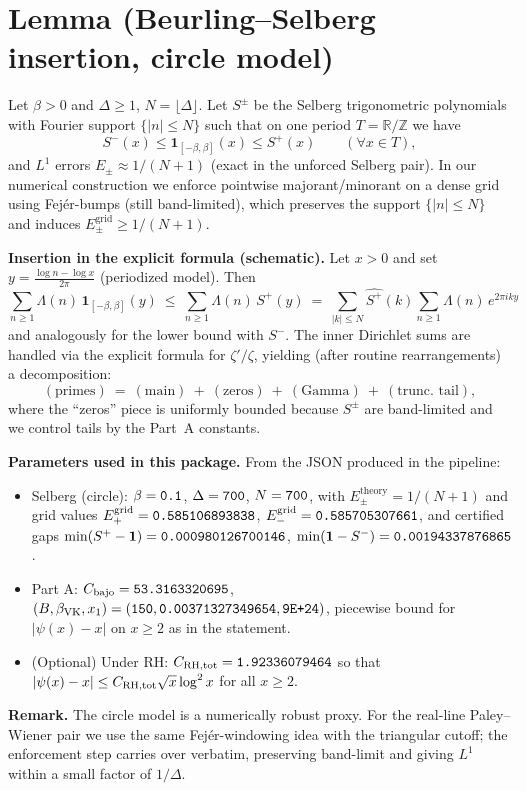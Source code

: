 ﻿\documentclass[11pt]{article}
\newcommand{\Chi}{\mathbf{1}}
\begin{document}
\section*{Lemma (Beurling--Selberg insertion, circle model)}
Let $\beta>0$ and $\Delta\ge1$, $N=\lfloor\Delta\rfloor$. Let $S^\pm$ be the Selberg trigonometric polynomials with
Fourier support $\{|n|\le N\}$ such that on one period $T=\mathbb{R}/\mathbb{Z}$ we have
\[
  S^-(x) \le \Chi_{[-\beta,\beta]}(x) \le S^+(x)\qquad(\forall x\in T),
\]
and $L^1$ errors $E_\pm \approx 1/(N+1)$ (exact in the unforced Selberg pair). In our numerical construction we enforce
pointwise majorant/minorant on a dense grid using Fejér-bumps (still band-limited), which preserves the support
$\{|n|\le N\}$ and induces $E_\pm^{\text{grid}}\ge 1/(N+1)$.

\medskip
\noindent\textbf{Insertion in the explicit formula (schematic).}
Let $x>0$ and set $y=\frac{\log n - \log x}{2\pi}$ (periodized model).
Then
\[
  \sum_{n\ge1} \Lambda(n)\, \Chi_{[-\beta,\beta]}(y)
  \ \le\ \sum_{n\ge1} \Lambda(n)\, S^+(y)
  \ =\ \sum_{|k|\le N} \widehat{S^+}(k) \sum_{n\ge1} \Lambda(n)\, e^{2\pi i k y}
\]
and analogously for the lower bound with $S^-$. The inner Dirichlet sums are handled via the explicit formula
for $\zeta'/\zeta$, yielding (after routine rearrangements) a decomposition:
\[
  (\text{primes})\ =\ (\text{main})\ +\ (\text{zeros})\ +\ (\text{Gamma})\ +\ (\text{trunc. tail}),
\]
where the ``zeros'' piece is uniformly bounded because $S^\pm$ are band-limited and we control tails by the Part~A constants.

\medskip
\noindent\textbf{Parameters used in this package.}
From the JSON produced in the pipeline:
\begin{itemize}
  \item Selberg (circle): $\beta = \verb|0.1|$, $\Delta=\verb|700|$, $N=\verb|700|$,
        with $E_\pm^{\text{theory}} = 1/(N+1)$ and grid values
        $E_+^{\text{grid}}=\verb|0.585106893838|$, $E_-^{\text{grid}}=\verb|0.585705307661|$,
        and certified gaps $\min(S^+-\Chi)=\verb|0.000980126700146|$, $\min(\Chi-S^-)=\verb|0.00194337876865|$.
  \item Part A: $C_{\text{bajo}}=\verb|53.3163320695|$, $(B,\beta_{\rm VK},x_1)=(\verb|150|,\verb|0.00371327349654|,\verb|9E+24|)$,
        piecewise bound for $|\psi(x)-x|$ on $x\ge2$ as in the statement.
  \item (Optional) Under RH: $C_{\rm RH,tot}=\verb|1.92336079464|$ so that
        $|\psi(x)-x|\le C_{\rm RH,tot}\sqrt{x}\log^2 x$ for all $x\ge2$.
\end{itemize}

\medskip
\noindent\textbf{Remark.} The circle model is a numerically robust proxy. For the real-line Paley--Wiener pair
we use the same Fejér-windowing idea with the triangular cutoff; the enforcement step carries over verbatim, preserving
band-limit and giving $L^1$ within a small factor of $1/\Delta$.
\end{document}
